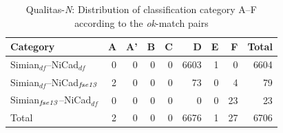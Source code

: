 \documentclass{IEEEtran}
\begin{document}

\begin{table}[H]
	\centering
	\caption{Qualitas-\textit{N}: Distribution of classification category A--F  according to the \textit{ok}-match pairs}
	\label{tab:ok_classification_new}
	\begin{tabular}{|l|r|r|r|r|r|r|r|r|}
		\hline 
		Category   																										& A   	& 	A' 	& 	B  & C	   & D   	&	E   &	F   & Total  \\
		\hline
		Simian$_{\mathrm{\textit{df}}}$--NiCad$_{\mathrm{\textit{df}}}$ & 0 & 0	& 0 & 0 & 6603 & 1 & 0 & 6604 \\
		Simian$_{\mathrm{\textit{df}}}$--NiCad$_{\textrm{\textit{fse13}}}$ 
		& 2 	& 0 	& 0 	& 0 	& 73 	 & 0 	  & 4 		&  79 \\
		Simian$_{\textrm{\textit{fse13}}}$--NiCad$_{\mathrm{\textit{df}}}$   									
		& 0 	& 0 	& 0 	& 0 	 & 0 	  & 0 		& 23 	& 23 \\
		\hline
		Total   & 2  	&   0   & 0   	&  0   &   6676   &   1   & 27  & 6706 \\
		\hline
	\end{tabular} 
\end{table}
\end{document}
